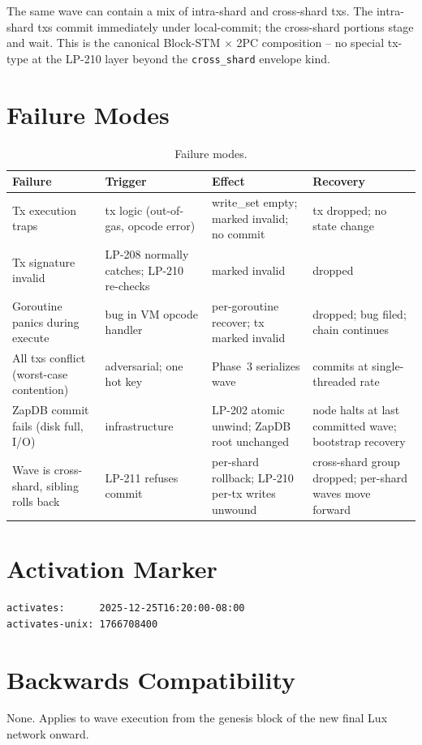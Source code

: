 The same wave can contain a mix of intra-shard and cross-shard txs.
The intra-shard txs commit immediately under local-commit; the
cross-shard portions stage and wait. This is the canonical
Block-STM $\times$ 2PC composition -- no special tx-type at the
LP-210 layer beyond the \texttt{cross\_shard} envelope kind.

\section{Failure Modes}

\begin{table}[h]
\centering
\small
\begin{tabular}{@{}p{3cm}p{3cm}p{4cm}p{3.5cm}@{}}
\toprule
\textbf{Failure} & \textbf{Trigger} & \textbf{Effect} & \textbf{Recovery} \\
\midrule
Tx execution traps & tx logic (out-of-gas, opcode error) & write\_set empty; marked invalid; no commit & tx dropped; no state change \\
Tx signature invalid & LP-208 normally catches; LP-210 re-checks & marked invalid & dropped \\
Goroutine panics during execute & bug in VM opcode handler & per-goroutine recover; tx marked invalid & dropped; bug filed; chain continues \\
All txs conflict (worst-case contention) & adversarial; one hot key & Phase~3 serializes wave & commits at single-threaded rate \\
ZapDB commit fails (disk full, I/O) & infrastructure & LP-202 atomic unwind; ZapDB root unchanged & node halts at last committed wave; bootstrap recovery \\
Wave is cross-shard, sibling rolls back & LP-211 refuses commit & per-shard rollback; LP-210 per-tx writes unwound & cross-shard group dropped; per-shard waves move forward \\
\bottomrule
\end{tabular}
\caption{Failure modes.}
\label{tab:failures}
\end{table}

\section{Activation Marker}

\begin{verbatim}
activates:      2025-12-25T16:20:00-08:00
activates-unix: 1766708400
\end{verbatim}

\section{Backwards Compatibility}

None. Applies to wave execution from the genesis block of the new
final Lux network onward.
